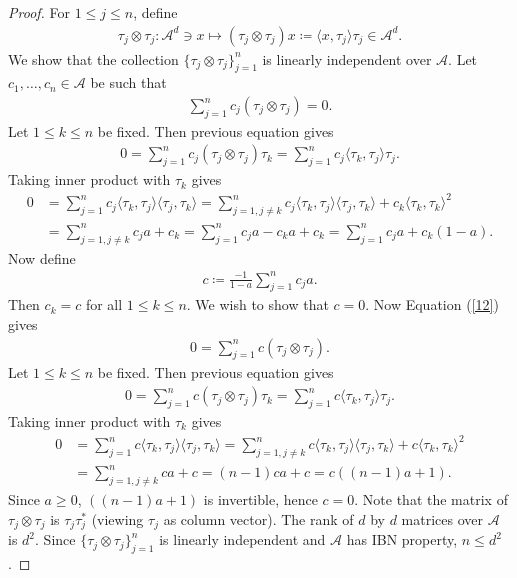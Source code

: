 \documentclass{amsart}
\begin{document}
\begin{proof}
For $1\leq j \leq n$, define 
\begin{align*}
	\tau_j \otimes \tau_j: \mathcal{A}^d \ni x \mapsto(\tau_j \otimes \tau_j)x\coloneqq\langle x, \tau_j\rangle \tau_j \in \mathcal{A}^d.
\end{align*}
We show that the collection $\{\tau_j \otimes \tau_j\}_{j=1}^n$   is linearly independent  over  $\mathcal{A}$. Let $c_1, \dots,  c_n \in \mathcal{A}$ be such that 
\begin{align}\label{12}
	\sum_{j=1}^{n}c_j(\tau_j \otimes \tau_j)=0.
\end{align}
Let $1\leq k \leq n$ be fixed. Then previous equation gives 
\begin{align*}
		0=\sum_{j=1}^{n}c_j(\tau_j \otimes \tau_j)\tau_k=\sum_{j=1}^{n}c_j\langle \tau_k, \tau_j\rangle \tau_j.
\end{align*}
Taking inner product with $\tau_k$ gives 
\begin{align*}
	0&=\sum_{j=1}^{n}c_j\langle \tau_k, \tau_j\rangle \langle \tau_j, \tau_k \rangle=\sum_{j=1, j\neq k}^nc_j\langle \tau_k, \tau_j\rangle \langle \tau_j, \tau_k\rangle +c_k\langle \tau_k, \tau_k\rangle^2\\
	&=\sum_{j=1, j\neq k}^nc_ja+c_k=\sum_{j=1}^nc_ja-c_ka+c_k=\sum_{j=1}^nc_ja+c_k(1-a).
\end{align*}
Now define 
\begin{align*}
	c\coloneqq \frac{-1}{1-a}\sum_{j=1}^{n}c_ja.
\end{align*}
Then $c_k=c$ for all $1\leq k \leq n$. We wish to show that $c=0$. Now Equation (\ref{12}) gives 
\begin{align*}
	0=	\sum_{j=1}^{n}c(\tau_j \otimes \tau_j).
\end{align*}
Let $1\leq k \leq n$ be fixed. Then previous equation gives 
\begin{align*}
	0=\sum_{j=1}^{n}c(\tau_j \otimes \tau_j)\tau_k=\sum_{j=1}^{n}c\langle \tau_k, \tau_j\rangle \tau_j.
\end{align*}
Taking inner product with $\tau_k$ gives 
\begin{align*}
	0&=\sum_{j=1}^{n}c\langle \tau_k, \tau_j\rangle \langle \tau_j, \tau_k \rangle=\sum_{j=1, j\neq k}^nc\langle \tau_k, \tau_j\rangle \langle \tau_j, \tau_k\rangle +c\langle \tau_k, \tau_k\rangle^2\\
	&=\sum_{j=1, j\neq k}^nca+c=(n-1)ca+c=c((n-1)a+1).
\end{align*}
Since $a\geq0$, $((n-1)a+1)$ is invertible, hence $c=0$. Note that  the matrix of $\tau_j \otimes \tau_j$ is $\tau_j \tau_j^*$ (viewing $\tau_j$ as column vector). The rank of $d$ by $d$ matrices over $\mathcal{A}$ is $d^2$. Since $\{\tau_j \otimes \tau_j\}_{j=1}^n$ is linearly independent and $\mathcal{A}$ has IBN property, $n\leq d^2$. 
\end{proof}
\end{document}
